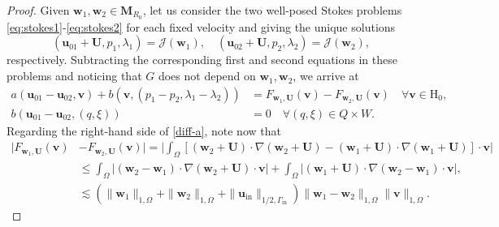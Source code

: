 \documentclass[10pt,a4paper]{amsart}
\newcommand\Gi{\Gamma_{\mathrm{in}}}
\newcommand\bH{\boldsymbol{\mathrm{H}}}
\newcommand\bM{\mathbf{M}}
\newcommand\bU{\boldsymbol{U}}
\newcommand\buin{\boldsymbol{u}_{\mathrm{in}}}
\newcommand\bu{\boldsymbol{u}}
\newcommand\bv{\boldsymbol{v}}
\newcommand\bw{\boldsymbol{w}}
\begin{document}
\begin{proof}
Given $\bw_1,\bw_2 \in \bM_{R_0}$, let us consider the two well-posed Stokes problems \eqref{eq:stokes1}-\eqref{eq:stokes2} for each fixed velocity and giving the unique solutions 
\[(\bu_{01}+\bU,p_1,\lambda_1) = \mathcal{J}(\bw_1), \quad (\bu_{02}+\bU,p_2,\lambda_2) = \mathcal{J}(\bw_2) ,\]
respectively. %
Subtracting the corresponding first and second equations in these problems and noticing that $G$ does not depend on $\bw_1,\bw_2$, we arrive at 
\begin{subequations}\label{diff-}
  \begin{align}
 \label{diff-a}	   a(\bu_{01}-\bu_{02},\bv)  + b(\bv,(p_1-p_2,\lambda_1-\lambda_2)) & = F_{\bw_1,\bU}(\bv) -F_{\bw_2,\bU}(\bv) \quad \forall \bv \in \bH_0,\\
 			   b(\bu_{01}-\bu_{02},(q,\xi)) & = 0 \quad \forall (q,\xi)\in Q\times W.
 		\end{align}\end{subequations}
Regarding  the right-hand side of \eqref{diff-a}, note now that 
\begin{align*}
|F_{\bw_1,\bU}(\bv) &-F_{\bw_2,\bU}(\bv) |  = \biggl|\int_\Omega [(\bw_2+\bU)\cdot \nabla (\bw_2+\bU)-(\bw_1+\bU)\cdot \nabla (\bw_1+\bU)]\cdot \bv\biggr| \\
& \leq \int_\Omega |(\bw_2 - \bw_1)\cdot \nabla (\bw_2+\bU) \cdot \bv | + \int_\Omega |(\bw_1+\bU) \cdot \nabla (\bw_2-\bw_1) \cdot \bv|,\\
& \lesssim (\|\bw_1\|_{1,\Omega} + \|\bw_2\|_{1,\Omega} + \|\buin\|_{1/2,\Gi})\|\bw_1-\bw_2\|_{1,\Omega}\|\bv\|_{1,\Omega}.
\end{align*}



\end{proof}
\end{document}
